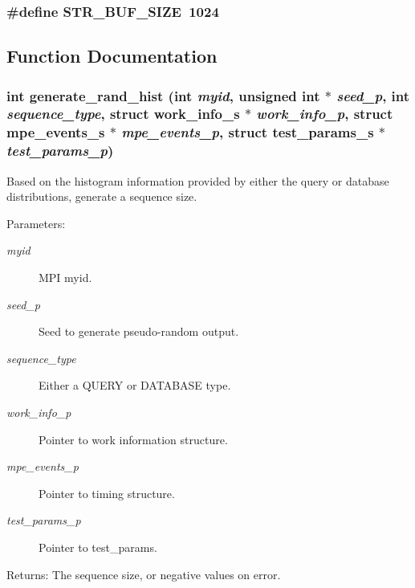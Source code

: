 \subsubsection{\setlength{\rightskip}{0pt plus 5cm}\#define STR\_\-BUF\_\-SIZE~1024}\label{hist__params_8c_d6e15065c0a342050a71942658732756}




\subsection{Function Documentation}
\subsubsection{\setlength{\rightskip}{0pt plus 5cm}int generate\_\-rand\_\-hist (int {\em myid}, unsigned int $\ast$ {\em seed\_\-p}, int {\em sequence\_\-type}, struct \bf{work\_\-info\_\-s} $\ast$ {\em work\_\-info\_\-p}, struct \bf{mpe\_\-events\_\-s} $\ast$ {\em mpe\_\-events\_\-p}, struct \bf{test\_\-params\_\-s} $\ast$ {\em test\_\-params\_\-p})}\label{hist__params_8c_c635ab29585dee9b74c4b7b21055d05b}


Based on the histogram information provided by either the query or database distributions, generate a sequence size.

\begin{Desc}
\item[Parameters:]
\begin{description}
\item[{\em myid}]MPI myid. \item[{\em seed\_\-p}]Seed to generate pseudo-random output. \item[{\em sequence\_\-type}]Either a QUERY or DATABASE type. \item[{\em work\_\-info\_\-p}]Pointer to work information structure. \item[{\em mpe\_\-events\_\-p}]Pointer to timing structure. \item[{\em test\_\-params\_\-p}]Pointer to test\_\-params. \end{description}
\end{Desc}
\begin{Desc}
\item[Returns:]The sequence size, or negative values on error. \end{Desc}
